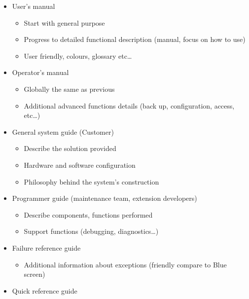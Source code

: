 \begin{itemize}
\begin{itemize}
    \item User’s manual
        \begin{itemize}
            \item Start with general purpose
            \item Progress to detailed functional description (manual, focus on how to use)
            \item User friendly, colours, glossary etc\ldots
        \end{itemize}
    \item Operator’s manual
        \begin{itemize}
            \item Globally the same as previous
            \item Additional advanced functions details (back up, configuration, access, etc\ldots)
        \end{itemize}
    \item General system guide (Customer)
        \begin{itemize}
            \item Describe the solution provided
            \item Hardware and software configuration
            \item Philosophy behind the system’s construction
        \end{itemize}
    \item Programmer guide (maintenance team, extension developers)
        \begin{itemize}
            \item Describe components, functions performed
            \item Support functions (debugging, diagnostics\ldots)
        \end{itemize}
    \item Failure reference guide
        \begin{itemize}
            \item Additional information about exceptions (friendly compare to Blue screen)
        \end{itemize}
    \item Quick reference guide
\end{itemize}
\end{itemize}

